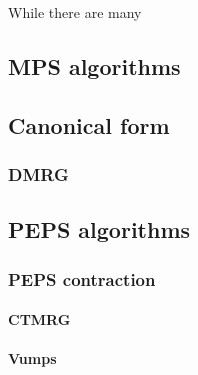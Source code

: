 
While there are many

\subsection{MPS algorithms}

\subsection{Canonical form}

\subsubsection{DMRG}

\subsection{PEPS algorithms}

\subsubsection{ PEPS contraction }

\paragraph{CTMRG}

\paragraph{Vumps}